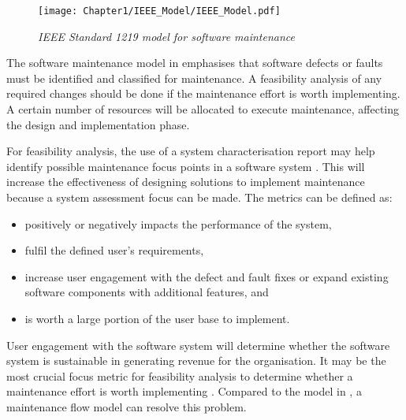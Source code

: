 \begin{figure}[!htb]
	\centering %
	\texttt{[image: Chapter1/IEEE\_Model/IEEE\_Model.pdf]}
	\caption[IEEE Standard 1219 model for software maintenance]
	{\textit{IEEE Standard 1219 model for software maintenance \cite{Ren2011}}} \label{fig:ch1_ieeeModel}
\end{figure}

The software maintenance model in  emphasises that software defects or faults must be identified and classified for maintenance. A feasibility analysis of any required changes should be done if the maintenance effort is worth implementing. A certain number of resources will be allocated to execute maintenance, affecting the design and implementation phase.\par For feasibility analysis, the use of a system characterisation report may help identify possible maintenance focus points in a software system \cite{Araujo2021}. This will increase the effectiveness of designing solutions to implement maintenance because a system assessment focus can be made. The metrics can be defined as:

\begin{itemize}
	\item positively or negatively impacts the performance of the system,
	\item fulfil the defined user's requirements,
	\item increase user engagement with the defect and fault fixes or expand existing software components with additional features, and
	\item is worth a large portion of the user base to implement.
\end{itemize}

User engagement with the software system will determine whether the software system is sustainable in generating revenue for the organisation. It may be the most crucial focus metric for feasibility analysis to determine whether a maintenance effort is worth implementing \cite{Araujo2021}. Compared to the model in , a maintenance flow model can resolve this problem.  

